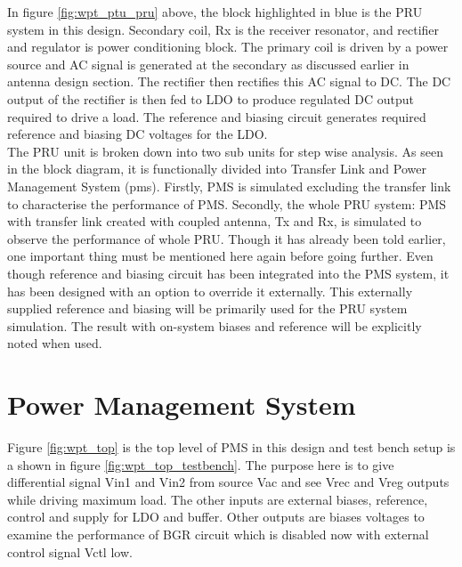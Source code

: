 \documentclass[UKenglish]{ifimaster}  %
\begin{document}
In figure \ref{fig:wpt_ptu_pru} above, the block highlighted in blue is the PRU system in this design. Secondary coil, Rx is the receiver resonator, and  
rectifier and regulator is power conditioning block. The primary coil is driven by a power source and AC signal is generated at the secondary as discussed 
earlier in antenna design section. The rectifier then rectifies this AC signal to DC. The DC output of the rectifier is then fed to LDO 
to produce regulated DC output required to drive a load. The reference and biasing circuit generates required reference and biasing DC voltages for the LDO. \\

The PRU unit is broken down into two sub units for step wise analysis. As seen in the block diagram, it is functionally divided into Transfer Link and 
Power Management System (\acrshort{pms}). Firstly, PMS is simulated excluding the transfer link to characterise the performance of PMS. Secondly, the whole PRU system: PMS with transfer link created with coupled antenna, Tx and Rx, is simulated to observe the performance of whole PRU. Though it has already been told earlier, 
one important thing must be mentioned here again before going further. Even though reference and biasing circuit has 
been integrated into the PMS system, it has been designed with an option to override it externally. This externally 
supplied reference and biasing will be primarily used for the PRU system simulation. The result with on-system biases 
and reference will be explicitly noted when used. \\


\section{Power Management System} %

Figure \ref{fig:wpt_top} is the top level of PMS in this design and test bench setup is a shown in figure \ref{fig:wpt_top_testbench}. The purpose here is to give differential signal Vin1 and Vin2 from source Vac and see Vrec and Vreg outputs while driving maximum load. The other inputs are external biases, reference, control and supply for LDO and buffer. Other outputs are biases voltages to examine the performance of BGR circuit which is disabled now with external control signal Vctl low.  \\
\end{document}
